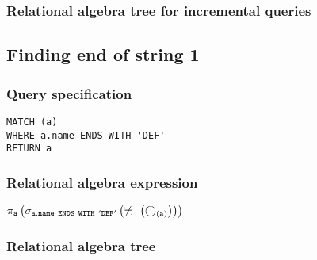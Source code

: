 \subsubsection*{Relational algebra tree for incremental queries}


\subsection{Finding end of string 1}

\subsubsection*{Query specification}

\begin{lstlisting}
MATCH (a)
WHERE a.name ENDS WITH 'DEF'
RETURN a
\end{lstlisting}

\subsubsection*{Relational algebra expression}

$\projection{\var{a}} \left(\selection{\mathtt{a.name~ENDS~WITH~'DEF'}} \left(\alldifferent{} \left(\getvertices{a}{}\right)\right)\right)$

\subsubsection*{Relational algebra tree}


